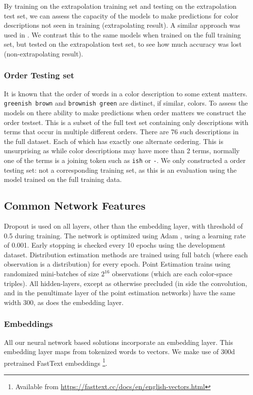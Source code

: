 \documentclass[11pt,a4paper]{article}
\newcommand{\parencite}{\citep}
\newcommand{\textcite}{\citet}
\newcommand{\natlang}[1]{\texttt{#1}}
\begin{document}
By training on the extrapolation training set and testing on the extrapolation test set, we can assess the capacity of the models to make predictions for color descriptions not seen in training (extrapolating result).
A similar approach was used in \textcite{DBLP:journals/corr/AtzmonBKGC16}.
We contrast this to the same models when trained on the full training set, but tested on the extrapolation test set, to see how much accuracy was lost (non-extrapolating result).


\subsubsection{Order Testing set}
It is known that the order of words in a color description to some extent matters.
\natlang{greenish brown} and \natlang{brownish green} are distinct, if similar, colors.
To assess the models on there ability to make predictions when order matters we construct the order testset.
This is a subset of the full test set containing only descriptions with terms that occur in multiple different orders.
There are 76 such descriptions in the full dataset.
Each of which has exactly one alternate ordering.
This is unsurprising as while color descriptions may have more than 2 terms, normally one of the terms is a joining token such as \natlang{ish} or \natlang{-}.
We only constructed a order testing set: not a corresponding training set, as this is an evaluation using the model trained on the full training data.



\subsection{Common Network Features}
Dropout\parencite{srivastava2014dropout}  is used on all layers, other than the embedding layer, with threshold of 0.5 during training.
The network is optimized using Adam
\cite{kingma2014adam}, using a learning rate of 0.001.
Early stopping is checked every 10 epochs using the development dataset.
Distribution estimation methods are trained using full batch (where each observation is a distribution) for every epoch.
Point Estimation trains using randomized mini-batches of size $2^16$ observations (which are each color-space triples).
All hidden-layers, except as otherwise precluded (in side the convolution, and in the penultimate layer of the point estimation networks) have the same width 300, as does the embedding layer.


\subsubsection{Embeddings}\label{sec:embeddings} 
All our neural network based solutions incorporate an embedding layer.
This embedding layer maps from tokenized words to vectors.
We make use of 300d pretrained FastText embeddings \textcite{bojanowski2016enriching}\footnote{Available from \url{https://fasttext.cc/docs/en/english-vectors.html}}.
\end{document}
